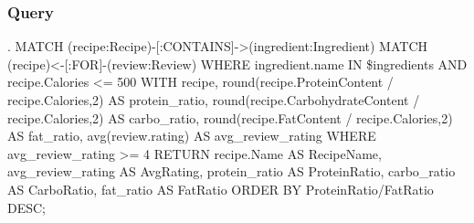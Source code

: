 \begin{enumerate}
    \subsubsection{Query}
\begin{CypherQuery}
.
MATCH (recipe:Recipe)-[:CONTAINS]->(ingredient:Ingredient)
MATCH (recipe)<-[:FOR]-(review:Review)
WHERE ingredient.name IN \$ingredients 
AND recipe.Calories <= 500
WITH recipe, 
round(recipe.ProteinContent / recipe.Calories,2) AS protein_ratio,
round(recipe.CarbohydrateContent / recipe.Calories,2) AS carbo_ratio,
round(recipe.FatContent / recipe.Calories,2) AS fat_ratio,
avg(review.rating) AS avg_review_rating
WHERE avg_review_rating >= 4
RETURN recipe.Name AS RecipeName, 
avg_review_rating AS AvgRating, 
protein_ratio AS ProteinRatio, 
carbo_ratio AS CarboRatio, 
fat_ratio AS FatRatio
ORDER BY ProteinRatio/FatRatio DESC;
\end{CypherQuery}


\end{enumerate}

